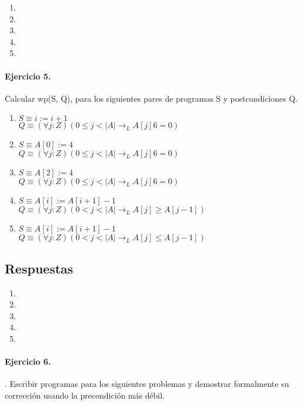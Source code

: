 \documentclass{article}
\begin{document}
\begin{enumerate}[label=\alph*)]
	\item
	\item
	\item
	\item
	\item
\end{enumerate}

\paragraph{Ejercicio 5.} Calcular wp(S, Q), para los siguientes pares de programas S y postcondiciones Q.

\begin{enumerate}[label=\alph*)]
\item $S \equiv i := i + 1$\\
  $Q \equiv (\forall j :Z)(0 \leq j < |A| \rightarrow_L A[j] 6= 0)$
\item $S \equiv A[0] := 4$\\
   $Q \equiv (\forall j :Z)(0 \leq j < |A| \rightarrow_L A[j] 6= 0)$
\item $S \equiv A[2] := 4$\\
   $Q \equiv (\forall j :Z)(0 \leq j < |A| \rightarrow_L A[j] 6= 0)$
\item $S \equiv A[i] := A[i+1] - 1$\\
   $Q \equiv (\forall j :Z)(0 < j < |A| \rightarrow_L A[j] \geq A[j - 1])$
\item $S \equiv A[i] := A[i+1] - 1$\\
   $Q \equiv (\forall j :Z)(0 < j < |A| \rightarrow_L A[j] \leq A[j - 1])$
\end{enumerate}

\subsection*{Respuestas}

\begin{enumerate}[label=\alph*)]
	\item
	\item
	\item
	\item
	\item
\end{enumerate}

\paragraph{Ejercicio 6.}. Escribir programas para los siguientes problemas y demostrar 
formalmente su corrección usando la precondición
más débil.
\end{document}
